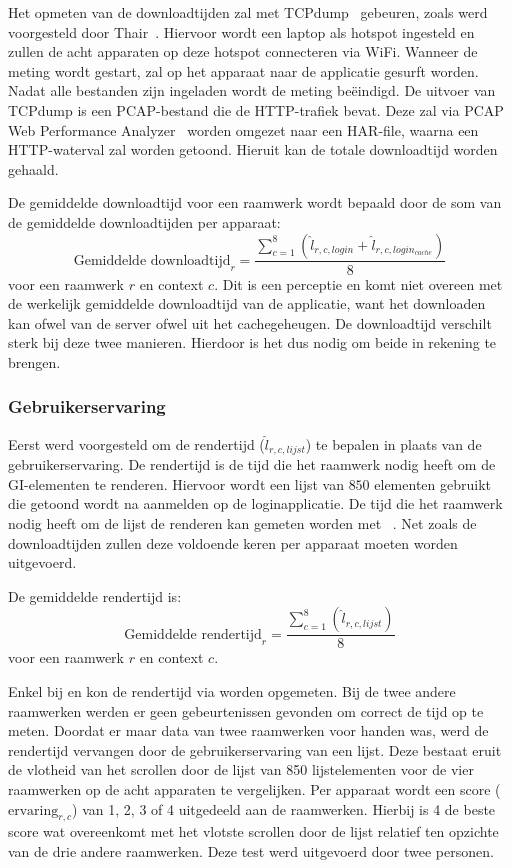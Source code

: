 Het opmeten van de downloadtijden zal met TCPdump~\cite{Tcpdump2010} gebeuren, zoals werd voorgesteld door Thair~\cite{Thair2011}.
Hiervoor wordt een laptop als hotspot ingesteld en zullen de acht apparaten op deze hotspot connecteren via WiFi.
Wanneer de meting wordt gestart, zal op het apparaat naar de applicatie gesurft worden.
Nadat alle bestanden zijn ingeladen wordt de meting beëindigd. 
De uitvoer van TCPdump is een PCAP-bestand die de HTTP-trafiek bevat.
Deze zal via PCAP Web Performance Analyzer~\cite{SongL.bmcquadeMdsteele2010} worden omgezet naar een HAR-file, waarna een HTTP-waterval zal worden getoond.
Hieruit kan de totale downloadtijd worden gehaald.

De gemiddelde downloadtijd voor een raamwerk wordt bepaald door de som van de gemiddelde downloadtijden per apparaat:
\begin{equation}
  \text{Gemiddelde downloadtijd}_r= \frac{\sum\limits_{c=1}^{8}{\left(\widehat{l}_{r,c,login}+\widehat{l}_{r,c,login_{cache}}\right)}}{8}
    \label{eq:totale-downloadtijd}
\end{equation}
voor een raamwerk $r$ en context $c$.
Dit is een perceptie en komt niet overeen met de werkelijk gemiddelde downloadtijd van de applicatie, want het downloaden kan ofwel van de server ofwel uit het cachegeheugen.
De downloadtijd verschilt sterk bij deze twee manieren.
Hierdoor is het dus nodig om beide in rekening te brengen.

\subsubsection{Gebruikerservaring}
Eerst werd voorgesteld om de rendertijd ($\widehat{l}_{r,c,lijst}$) te bepalen in plaats van de gebruikerservaring.
De rendertijd is de tijd die het raamwerk nodig heeft om de GI-elementen te renderen.
Hiervoor wordt een lijst van $850$ elementen gebruikt die getoond wordt na aanmelden op de loginapplicatie.
De tijd die het raamwerk nodig heeft om de lijst de renderen kan gemeten worden met \js~\cite{Thair2011}.
Net zoals de downloadtijden zullen deze voldoende keren per apparaat moeten worden uitgevoerd.

De gemiddelde rendertijd is:
\begin{equation}
 \text{Gemiddelde rendertijd}_r= \frac{\sum\limits_{c=1}^{8}{\left(\widehat{l}_{r,c,lijst}\right)}}{8}
 \label{eq:totale-gebruikerservaring}
\end{equation}
voor een raamwerk $r$ en context $c$.

Enkel bij \jqm{} en \kendo{} kon de rendertijd via \js{} worden opgemeten.
Bij de twee andere raamwerken werden er geen gebeurtenissen gevonden om correct de tijd op te meten.
Doordat er maar data van twee raamwerken voor handen was, werd de rendertijd vervangen door de gebruikerservaring van een lijst.
Deze bestaat eruit de vlotheid van het scrollen door de lijst van 850 lijstelementen voor de vier raamwerken op de acht apparaten te vergelijken.
Per apparaat wordt een score ($\text{ervaring}_{r,c}$) van 1, 2, 3 of 4 uitgedeeld aan de raamwerken.
Hierbij is 4 de beste score wat overeenkomt met het vlotste scrollen door de lijst relatief ten opzichte van de drie andere raamwerken.
Deze test werd uitgevoerd door twee personen.

